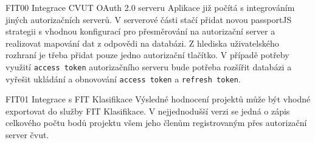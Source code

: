 \begin{dl}


   \item[FIT00 Integrace CVUT OAuth 2.0 serveru]
   Aplikace již počítá s integrováním jiných autorizačních serverů. V serverové části stačí přidat novou passportJS strategii s vhodnou konfigurací pro přesměrování na autorizační server a realizovat mapování dat z odpovědi na databázi. Z hlediska uživatelského rozhraní je třeba přidat pouze jedno autorizační tlačítko. V případě potřeby využití \texttt{access token} autorizačního serveru bude potřeba rozšířit databázi a vyřešit ukládání a obnovování \texttt{access token} a \texttt{refresh token}.

   \item[FIT01 Integrace s FIT Klasifikace]
   Výsledné hodnocení projektů může být vhodné exportovat do služby FIT Klasifikace. V nejjednodušší verzi se jedná o zápis celkového počtu bodů projektu všem jeho členům registrovaným přes autorizační server \gls{čvut}. 

\end{dl}
